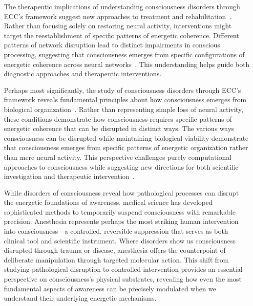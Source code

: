 The therapeutic implications of understanding consciousness disorders through ECC's framework suggest new approaches to treatment and rehabilitation~\cite{Giacino2014}. Rather than focusing solely on restoring neural activity, interventions might target the reestablishment of specific patterns of energetic coherence. Different patterns of network disruption lead to distinct impairments in conscious processing, suggesting that consciousness emerges from specific configurations of energetic coherence across neural networks~\cite{Dehaene2011}. This understanding helps guide both diagnostic approaches and therapeutic interventions.

Perhaps most significantly, the study of consciousness disorders through ECC's framework reveals fundamental principles about how consciousness emerges from biological organization~\cite{da2024mathematical}. Rather than representing simple loss of neural activity, these conditions demonstrate how consciousness requires specific patterns of energetic coherence that can be disrupted in distinct ways. The various ways consciousness can be disrupted while maintaining biological viability demonstrate that consciousness emerges from specific patterns of energetic organization rather than mere neural activity. This perspective challenges purely computational approaches to consciousness while suggesting new directions for both scientific investigation and therapeutic intervention~\cite{hunt2024electromagnetic}.

While disorders of consciousness reveal how pathological processes can disrupt the energetic foundations of awareness, medical science has developed sophisticated methods to temporarily suspend consciousness with remarkable precision. Anesthesia represents perhaps the most striking human intervention into consciousness—a controlled, reversible suppression that serves as both clinical tool and scientific instrument. Where disorders show us consciousness disrupted through trauma or disease, anesthesia offers the counterpoint of deliberate manipulation through targeted molecular action. This shift from studying pathological disruption to controlled intervention provides an essential perspective on consciousness's physical substrates, revealing how even the most fundamental aspects of awareness can be precisely modulated when we understand their underlying energetic mechanisms.
